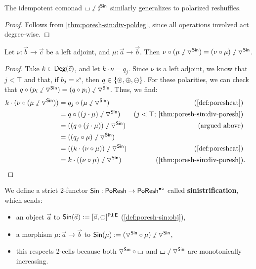 \documentclass[a4paper]{memoir}
\begin{document}
{\begin{proposition}
	The idempotent comonad ${\llcorner\hspace{-.4ex}\lrcorner} \mathbin{\sswarrow} \sharp^{\mathsf{Sin}}$ similarly generalizes to polarized reshuffles.
\end{proposition}
\begin{proof}
	Follows from \cref{thm:poresh-sin:div-poldeg}, since all operations involved act degree-wise.
\end{proof}
\begin{lemma} \label{thm:poresh-sin:div-poresh:fuse}
	Let $\nu : \vec b \to \vec c$ be a left adjoint, and $\mu : \vec a \to \vec b$. Then $\nu \circ (\mu \mathbin{\sswarrow} {\triangledown}^{\mathsf{Sin}}) = (\nu \circ \mu) \mathbin{\sswarrow} {\triangledown}^{\mathsf{Sin}}$.
\end{lemma}
\begin{proof}
	Take $k \in {\mathsf{Deg}}(\vec c)$, and let $k \cdot \nu = q_j$. Since $\nu$ is a left adjoint, we know that $j < \top$ and that, if $b_j = \ypolar$, then $q \in \mathopen{}\left\{ {\oast}, {\oplus}, {\ominus} \right\}\mathclose{}$.
	For these polarities, we can check that $q \circ (p_i \mathbin{\sswarrow} {\triangledown}^{\mathsf{Sin}}) = (q \circ p_i) \mathbin{\sswarrow} {\triangledown}^{\mathsf{Sin}}$.
	Thus, we find:
	\begin{align*}
		k \cdot (\nu \circ (\mu \divleft \cohcodisc^\Sin))
		&= q_j \circ (\mu \divleft \cohcodisc^\Sin)
		& (\text{\cref{def:poreshcat}}) \\
		&= q \circ ((j \cdot \mu) \divleft \cohcodisc^\Sin)
		& (\text{$j < \top$; \cref{thm:poresh-sin:div-poresh}}) \\
		&= ((q \circ (j \cdot \mu)) \divleft \cohcodisc^\Sin)
		& (\text{argued above}) \\
		&= ((q_j \circ \mu) \divleft \cohcodisc^\Sin) \\
		&= ((k \cdot (\nu \circ \mu)) \divleft \cohcodisc^\Sin)
		& (\text{\cref{def:poreshcat}}) \\
		&= k \cdot ((\nu \circ \mu) \divleft \cohcodisc^\Sin)
		& (\text{\cref{thm:poresh-sin:div-poresh}})&. &\qedhere
	\end{align*}
\end{proof}
\begin{definition} \label{def:sin}
	We define a strict 2-functor ${\mathsf{Sin}} : \mathsf{PoResh} \to \mathsf{PoResh}^{\bullet \circ}$ called \textbf{sinistrification}, which sends:
	\begin{itemize}
		\item an object $\vec a$ to $\Sin(\vec a) := \maskop{[\vec a, \npolar]}{\maskpj}{\maske}$ (\cref{def:poresh-sin:obj}),
		\item a morphism $\mu : \vec a \to \vec b$ to ${\mathsf{Sin}}(\mu) := ({\triangledown}^{\mathsf{Sin}} \circ \mu) \mathbin{\sswarrow} {\triangledown}^{\mathsf{Sin}}$,
		\item this respects 2-cells because both ${\triangledown}^{\mathsf{Sin}} \circ {\llcorner\hspace{-.4ex}\lrcorner}$ and ${\llcorner\hspace{-.4ex}\lrcorner} \mathbin{\sswarrow} {\triangledown}^{\mathsf{Sin}}$ are monotonically increasing.

\end{itemize}
\end{definition}}
\end{document}
